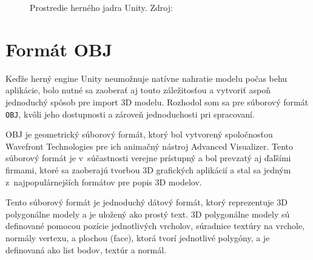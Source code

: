 \begin{figure}[H]
\centering
{}
\caption{Prostredie herného jadra Unity. Zdroj: \cite{smith2013unity} }
\label{prostredieUnity}
\end{figure}


\section{Formát OBJ}

Keďže herný engine Unity neumožnuje natívne nahratie modelu počas behu aplikácie, bolo nutné sa zaoberať aj touto záležitosťou a vytvoriť aspoň jednoduchý spôsob pre import 3D modelu.
Rozhodol som sa pre súborový formát {\tt OBJ}, kvôli jeho dostupnosti a zároveň jednoduchosti pri spracovaní. 

OBJ je geometrický súborový formát, ktorý bol vytvorený spoločnosťou Wavefront Technologies pre ich animačný nástroj Advanced Visualizer. Tento súborový formát je v~súčastnosti verejne prístupný a bol prevzatý aj ďaľšími firmami, ktoré sa zaoberajú tvorbou 3D grafických aplikácií a stal sa jedným z~najpopulárnejších formátov pre popis 3D modelov.

Tento súborový formát je jednoduchý dátový formát, ktorý reprezentuje 3D polygonálne modely a je uložený ako prostý text. 3D polygonálne modely sú definované pomocou pozície jednotlivých vrcholov, súradnice textúry na vrchole, normály vertexu, a plochou (face), ktorá tvorí jednotlivé polygóny, a je definovaná ako list bodov, textúr a normál.

